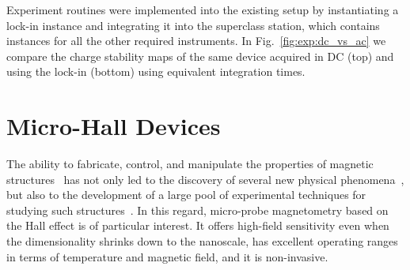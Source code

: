 Experiment routines were implemented into the existing setup by instantiating a lock-in instance and integrating it into the superclass station, which contains instances for all the other required instruments. In Fig.~\ref{fig:exp:dc_vs_ac} we compare the charge stability maps of the same device acquired in \gls{DC} (top) and using the lock-in (bottom) using equivalent integration times.

\section{Micro-Hall Devices}\label{ch:instr_dev:sec:hall_bar}

The ability to fabricate, control, and manipulate the properties of magnetic structures~\cite{coronado2020molecular} has not only led to the discovery of several new physical phenomena~\cite{coronado2010coexistence, bogani2008molecular, cervetti2016classical}, but also to the development of a large pool of experimental techniques for studying such structures~\cite{tang2011characteristics, collomb2019nanoscale}. In this regard, micro-probe magnetometry based on the Hall effect is of particular interest. It offers high-field sensitivity even when the dimensionality shrinks down to the nanoscale, has excellent operating ranges in terms of temperature and magnetic field, and it is non-invasive.

